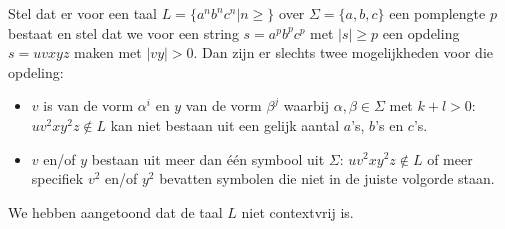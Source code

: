 Stel dat er voor een taal $L = \{a^nb^nc^n|n\geq\}$ over $\Sigma = \{a,b,c\}$ een pomplengte $p$ bestaat en stel dat we voor een string $s = a^pb^pc^p$ met $|s| \geq p$ een opdeling $s=uvxyz$ maken met $|vy| > 0$. Dan zijn er slechts twee mogelijkheden voor die opdeling:
\begin{itemize}
\item $v$ is van de vorm $\alpha^i$ en $y$ van de vorm $\beta^j$ waarbij $\alpha,\beta \in \Sigma$ met $k+l>0$: $uv^2xy^2z \notin L$ kan niet bestaan uit een gelijk aantal $a$'s, $b$'s en $c$'s.
\item $v$ en/of $y$ bestaan uit meer dan \'e\'en symbool uit $\Sigma$: $uv^2xy^2z \notin L$ of meer specifiek $v^2$ en/of $y^2$ bevatten symbolen die niet in de juiste volgorde staan.
\end{itemize}

We hebben aangetoond dat de taal $L$ niet contextvrij is.